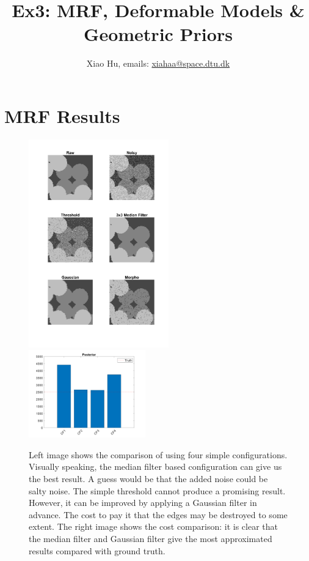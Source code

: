 \documentclass[a4paper]{article}
\title{Ex3: MRF, Deformable Models \& Geometric Priors}
\author{Xiao Hu, emails: \url{xiahaa@space.dtu.dk}}
\begin{document}
	\maketitle
	\thispagestyle{empty}
	\section{MRF Results}
	\begin{figure}[htbp]
	\centering
	\includegraphics[width=0.54\textwidth]{./figures/res2.png}
	\includegraphics[width=0.45\textwidth]{./figures/res4.png}
    \caption{Left image shows the comparison of using four simple configurations. Visually speaking, the median filter based configuration can give us the best result. A guess would be that the added noise could be salty noise. The simple threshold cannot produce a promising result. However, it can be improved by applying a Gaussian filter in advance. The cost to pay it that the edges may be destroyed to some extent. The right image shows the cost comparison: it is clear that the median filter and Gaussian filter give the most approximated results compared with ground truth.}
\end{figure}
\end{document}
